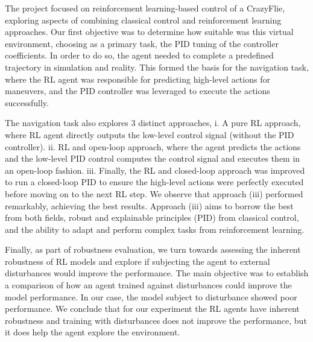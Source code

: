 \documentclass[../final.tex]{subfiles}
\begin{document}
The project focused on reinforcement learning-based control of a CrazyFlie, exploring aspects of combining classical control and reinforcement learning approaches. Our first objective was to determine how suitable was this virtual environment, choosing as a primary task, the PID tuning of the controller coefficients. In order to do so, the agent needed to complete a predefined trajectory in simulation and reality. This formed the basis for the navigation task, where the RL agent was responsible for predicting high-level actions for maneuvers, and the PID controller was leveraged to execute the actions successfully. 
	
	The navigation task also explores 3 distinct approaches, i. A pure RL approach, where RL agent directly outputs the low-level control signal (without the PID controller). ii. RL and open-loop approach, where the agent predicts the actions and the low-level PID control computes the control signal and executes them in an open-loop fashion. iii. Finally, the RL and closed-loop approach was improved to run a closed-loop PID to ensure the high-level actions were perfectly executed before moving on to the next RL step. We observe that approach (iii) performed remarkably, achieving the best results. Approach (iii) aims to borrow the best from both fields, robust and explainable principles (PID) from classical control, and the ability to adapt and perform complex tasks from reinforcement learning.
	
	Finally, as part of robustness evaluation, we turn towards assessing the inherent robustness of RL models and explore if subjecting the agent to external disturbances would improve the performance. The main objective was to establish a comparison of how an agent trained against disturbances could improve the model performance. In our case, the model subject to disturbance showed poor performance. We conclude that for our experiment the RL agents have inherent robustness and training with disturbances does not improve the performance, but it does help the agent explore the environment.
	
\end{document}

